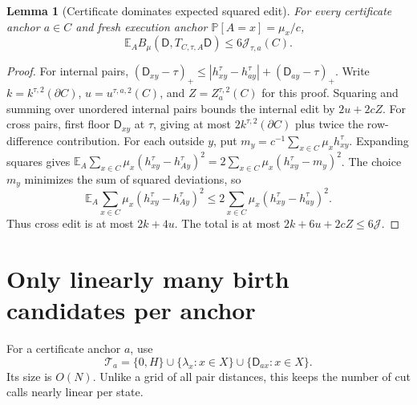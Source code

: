 \documentclass[11pt]{article}
\newtheorem{lemma}[theorem]{Lemma}
\theoremstyle{definition}
\newcommand{\E}{\mathbb E}
\newcommand{\Prb}{\mathbb P}
\newcommand{\cut}{\partial}
\begin{document}
\begin{lemma}[Certificate dominates expected squared edit]\label{l2:lem:edit}
For every certificate anchor $a\in C$ and fresh execution anchor
$\Prb[A=x]=\mu_x/c$,
\[
 \E_A B_\mu(\mathsf D,T_{C,\tau,A}\mathsf D)\le6\mathcal J_{\tau,a}(C).
\]
\end{lemma}
\begin{proof}
For internal pairs,
$(\mathsf D_{xy}-\tau)_+\le|h^\tau_{xy}-h^\tau_{ay}|+(\mathsf D_{ay}-\tau)_+$.
Write $k=k^{\tau,2}(\cut C)$, $u=u^{\tau,a,2}(C)$, and
$Z=Z^{\tau,2}_a(C)$ for this proof. Squaring and summing over unordered
internal pairs bounds the internal edit by $2u+2cZ$.
For cross pairs, first floor $\mathsf D_{xy}$ at $\tau$, giving at most
$2k^{\tau,2}(\cut C)$ plus twice the row-difference contribution.
For each outside $y$, put
$m_y=c^{-1}\sum_{x\in C}\mu_xh^\tau_{xy}$.
Expanding squares gives
$\E_A\sum_{x\in C}\mu_x(h^\tau_{xy}-h^\tau_{Ay})^2
=2\sum_{x\in C}\mu_x(h^\tau_{xy}-m_y)^2$.
The choice $m_y$ minimizes the sum of squared deviations, so
\[
 \E_A\sum_{x\in C}\mu_x(h^\tau_{xy}-h^\tau_{Ay})^2
 \le2\sum_{x\in C}\mu_x(h^\tau_{xy}-h^\tau_{ay})^2.
\]
Thus cross edit is at most $2k+4u$. The total is at most
$2k+6u+2cZ\le6\mathcal J$.
\end{proof}

\section{Only linearly many birth candidates per anchor}

For a certificate anchor $a$, use
\[
 \mathcal T_a=\{0,H\}\cup\{\lambda_x:x\in X\}
                 \cup\{\mathsf D_{ax}:x\in X\}.
\]
Its size is $O(N)$. Unlike a grid of all pair distances, this keeps
the number of cut calls nearly linear per state.
\end{document}
